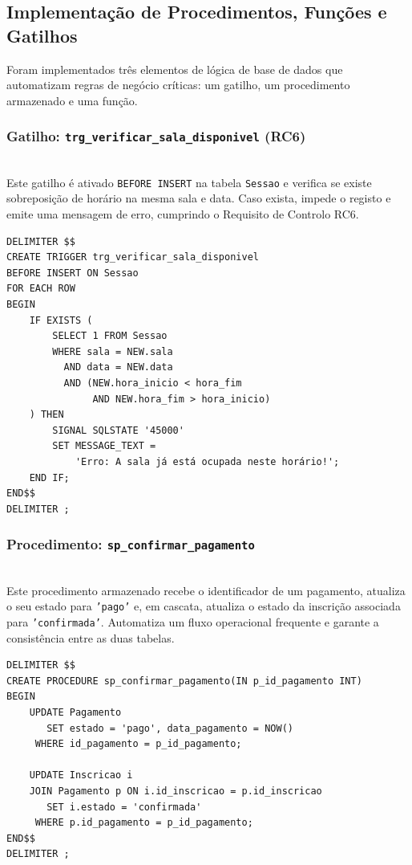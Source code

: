 \documentclass[runningheads]{llncs}
\begin{document}
                \subsection{Implementação de Procedimentos, Funções e Gatilhos}

                Foram implementados três elementos de lógica de base de dados que automatizam regras de negócio críticas: um gatilho, um procedimento armazenado e uma função.

                \subsubsection{Gatilho: \texttt{trg\_verificar\_sala\_disponivel} (RC6)}\mbox{}\\

                Este gatilho é ativado \texttt{BEFORE INSERT} na tabela \texttt{Sessao} e verifica se existe sobreposição de horário na mesma sala e data. Caso exista, impede o registo e emite uma mensagem de erro, cumprindo o Requisito de Controlo RC6.

                \begin{verbatim}
DELIMITER $$
CREATE TRIGGER trg_verificar_sala_disponivel
BEFORE INSERT ON Sessao
FOR EACH ROW
BEGIN
    IF EXISTS (
        SELECT 1 FROM Sessao
        WHERE sala = NEW.sala
          AND data = NEW.data
          AND (NEW.hora_inicio < hora_fim
               AND NEW.hora_fim > hora_inicio)
    ) THEN
        SIGNAL SQLSTATE '45000'
        SET MESSAGE_TEXT =
            'Erro: A sala já está ocupada neste horário!';
    END IF;
END$$
DELIMITER ;
                \end{verbatim}

                \subsubsection{Procedimento: \texttt{sp\_confirmar\_pagamento}}\mbox{}\\

                Este procedimento armazenado recebe o identificador de um pagamento, atualiza o seu estado para \texttt{'pago'} e, em cascata, atualiza o estado da inscrição associada para \texttt{'confirmada'}. Automatiza um fluxo operacional frequente e garante a consistência entre as duas tabelas.

                \begin{verbatim}
DELIMITER $$
CREATE PROCEDURE sp_confirmar_pagamento(IN p_id_pagamento INT)
BEGIN
    UPDATE Pagamento
       SET estado = 'pago', data_pagamento = NOW()
     WHERE id_pagamento = p_id_pagamento;

    UPDATE Inscricao i
    JOIN Pagamento p ON i.id_inscricao = p.id_inscricao
       SET i.estado = 'confirmada'
     WHERE p.id_pagamento = p_id_pagamento;
END$$
DELIMITER ;
                \end{verbatim}
\end{document}
